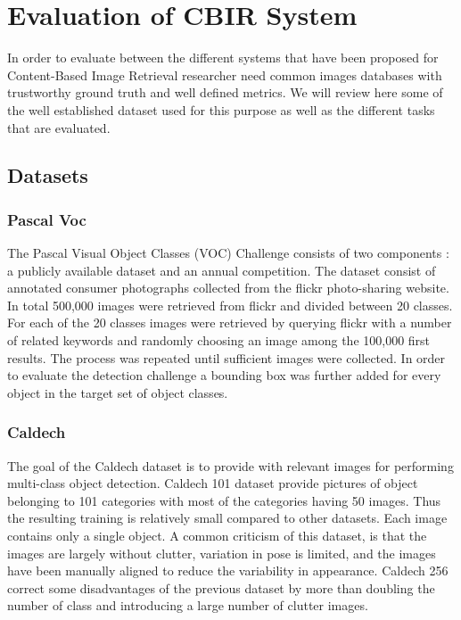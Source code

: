 \chapter{Evaluation of CBIR System}

  In order to evaluate between the different systems that have been proposed for Content-Based Image Retrieval researcher need common images databases with trustworthy ground truth and well defined metrics. We will review here some of the well established dataset used for this purpose as well as the different tasks that are evaluated.

\section{Datasets}

  \subsection{Pascal Voc}

    The Pascal Visual Object Classes (VOC) Challenge consists of two components : a publicly available dataset and an annual competition. The dataset consist of annotated consumer photographs collected from the flickr photo-sharing website. In total 500,000 images were retrieved from flickr and divided between 20 classes. For each of the 20 classes images were retrieved by querying flickr with a number of related keywords and randomly choosing an image among the 100,000 first results. The process was repeated until sufficient images were collected. In order to evaluate the detection challenge a bounding box was further added for every object in the target set of object classes.

  \subsection{Caldech}

    The goal of the Caldech dataset is to provide with relevant images for performing multi-class object detection. Caldech 101 dataset provide pictures of object belonging to 101 categories with most of the categories having 50 images. Thus the resulting training is relatively small compared to other datasets. Each image contains only a single object. A common criticism of this dataset, is that the images are largely without clutter, variation in pose is limited, and the images have been manually aligned to reduce the variability in appearance. Caldech 256 correct some disadvantages of the previous dataset by more than doubling the number of class and introducing a large number of clutter images.

